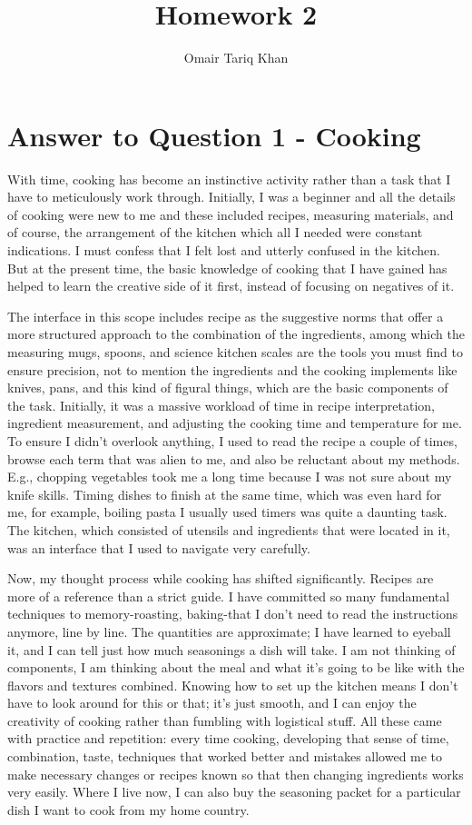 \documentclass[
	letterpaper, %
]{jdf}
\author{Omair Tariq Khan}
\title{Homework 2}
\begin{document}

\maketitle
\hfill \break
\hfill \break


\section{Answer to Question 1 - Cooking}
With time, cooking has become an instinctive activity rather than a task that I have to meticulously work through. Initially, I was a beginner and all the details of cooking were new to me and these included recipes, measuring materials, and of course, the arrangement of the kitchen which all I needed were constant indications. I must confess that I felt lost and utterly confused in the kitchen. But at the present time, the basic knowledge of cooking that I have gained has helped to learn the creative side of it first, instead of focusing on negatives of it.

The interface in this scope includes recipe as the suggestive norms that offer a more structured approach to the combination of the ingredients, among which the measuring mugs, spoons, and science kitchen scales are the tools you must find to ensure precision, not to mention the ingredients and the cooking implements like knives, pans, and this kind of figural things, which are the basic components of the task. Initially, it was a massive workload of time in recipe interpretation, ingredient measurement, and adjusting the cooking time and temperature for me. To ensure I didn't overlook anything, I used to read the recipe a couple of times, browse each term that was alien to me, and also be reluctant about my methods. E.g., chopping vegetables took me a long time because I was not sure about my knife skills. Timing dishes to finish at the same time, which was even hard for me, for example, boiling pasta I usually used timers was quite a daunting task. The kitchen, which consisted of utensils and ingredients that were located in it, was an interface that I used to navigate very carefully.

Now, my thought process while cooking has shifted significantly. Recipes are more of a reference than a strict guide. I have committed so many fundamental techniques to memory-roasting, baking-that I don't need to read the instructions anymore, line by line. The quantities are approximate; I have learned to eyeball it, and I can tell just how much seasonings a dish will take. I am not thinking of components, I am thinking about the meal and what it's going to be like with the flavors and textures combined. Knowing how to set up the kitchen means I don't have to look around for this or that; it's just smooth, and I can enjoy the creativity of cooking rather than fumbling with logistical stuff. All these came with practice and repetition: every time cooking, developing that sense of time, combination, taste, techniques that worked better and mistakes allowed me to make necessary changes or recipes known so that then changing ingredients works very easily. Where I live now, I can also buy the seasoning packet for a particular dish I want to cook from my home country. 
\end{document}
